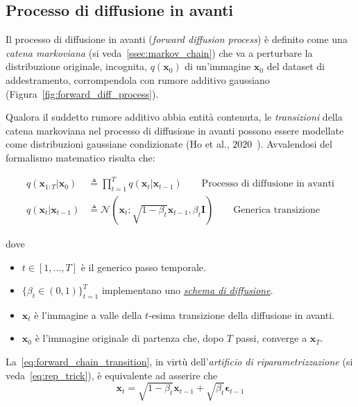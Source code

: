 \subsection{Processo di diffusione in avanti}

Il processo di diffusione in avanti (\emph{forward diffusion process}) è definito come una \emph{catena markoviana} (si veda~\ref{ssec:markov_chain})
che va a perturbare la distribuzione originale, incognita, $q(\mathbf{x}_0)$ di un'immagine $\mathbf{x}_0$ del dataset di addestramento, 
corrompendola con rumore additivo gaussiano (Figura~\ref{fig:forward_diff_process}).

Qualora il suddetto rumore additivo abbia entità contenuta, le \emph{transizioni} della catena markoviana nel processo di diffusione in avanti possono essere 
modellate come distribuzioni gaussiane condizionate (Ho et al., $2020$~\cite{ho2020}). Avvalendosi del formalismo matematico risulta che:
\smallskip
\begin{Mybox1}
\begin{align}
  q(\mathbf{x}_{1:T}|\mathbf{x}_0)  & \triangleq \prod\limits_{t=1}^{T}q(\mathbf{x}_t|\mathbf{x}_{t-1})\quad\quad \text{Processo di diffusione in avanti} \label{eq:forward_process}\\
  q(\mathbf{x}_t | \mathbf{x}_{t-1}) & \triangleq \mathcal{N}(\mathbf{x}_t; \sqrt{1-\beta_t}\mathbf{x}_{t-1},\beta_t \bm{I}) \quad\quad  \text{Generica transizione}\label{eq:forward_chain_transition}
\end{align}
\end{Mybox1}
\smallskip
\noindent dove
\begin{itemize}
  \item $t\in[1,\dots,T]$ è il generico passo temporale.
  \item $\{\beta_t \in (0,1)\}_{t=1}^T$ implementano uno \hyperref[sssec:diff_schedules]{\emph{schema di diffusione}}.
  \item $\mathbf{x}_t$ è l'immagine a valle della $t$-esima transizione della diffusione in avanti.
  \item $\mathbf{x}_0$ è l'immagine originale di partenza che, dopo $T$ passi,
  converge a $\mathbf{x}_T$.
\end{itemize}
\bigskip
\noindent La~\eqref{eq:forward_chain_transition}, in virtù dell'\emph{artificio di riparametrizzazione} 
(si veda~\eqref{eq:rep_trick}), è equivalente ad asserire che
\begin{equation}\label{eq:rep_chain_transition}
 \mathbf{x}_t = \sqrt{1-\beta_t}\mathbf{x}_{t-1} + \sqrt{\beta_t}\bm{\epsilon}_{t-1} 
\end{equation}
